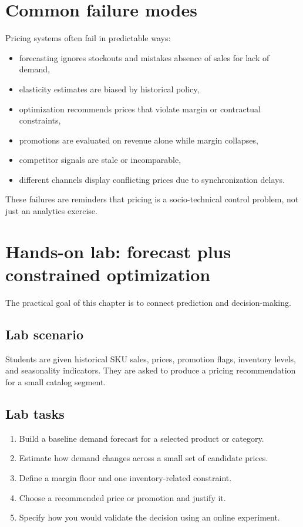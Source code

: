 \section{Common failure modes}
Pricing systems often fail in predictable ways:
\begin{itemize}
  \item forecasting ignores stockouts and mistakes absence of sales for lack of demand,
  \item elasticity estimates are biased by historical policy,
  \item optimization recommends prices that violate margin or contractual constraints,
  \item promotions are evaluated on revenue alone while margin collapses,
  \item competitor signals are stale or incomparable,
  \item different channels display conflicting prices due to synchronization delays.
\end{itemize}

These failures are reminders that pricing is a socio-technical control problem, not just an analytics exercise.

\section{Hands-on lab: forecast plus constrained optimization}
The practical goal of this chapter is to connect prediction and decision-making.

\subsection{Lab scenario}
Students are given historical SKU sales, prices, promotion flags, inventory levels, and seasonality indicators.
They are asked to produce a pricing recommendation for a small catalog segment.

\subsection{Lab tasks}
\begin{enumerate}
  \item Build a baseline demand forecast for a selected product or category.
  \item Estimate how demand changes across a small set of candidate prices.
  \item Define a margin floor and one inventory-related constraint.
  \item Choose a recommended price or promotion and justify it.
  \item Specify how you would validate the decision using an online experiment.
\end{enumerate}

